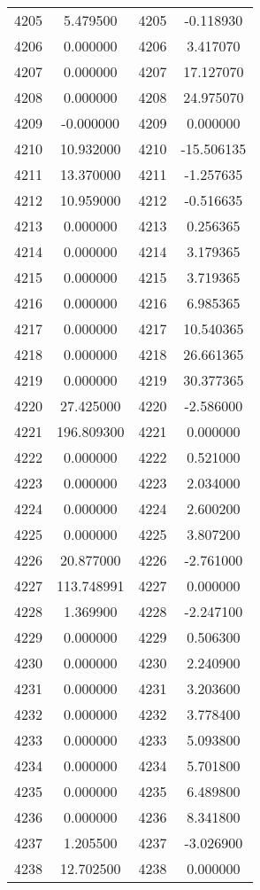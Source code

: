 \documentclass[12pt]{article}
\begin{document}
\begin{longtable}{@{}cccc@{}}
4205 & 5.479500 & 4205 & -0.118930 \\
4206 & 0.000000 & 4206 & 3.417070 \\
4207 & 0.000000 & 4207 & 17.127070 \\
4208 & 0.000000 & 4208 & 24.975070 \\
4209 & -0.000000 & 4209 & 0.000000 \\
4210 & 10.932000 & 4210 & -15.506135 \\
4211 & 13.370000 & 4211 & -1.257635 \\
4212 & 10.959000 & 4212 & -0.516635 \\
4213 & 0.000000 & 4213 & 0.256365 \\
4214 & 0.000000 & 4214 & 3.179365 \\
4215 & 0.000000 & 4215 & 3.719365 \\
4216 & 0.000000 & 4216 & 6.985365 \\
4217 & 0.000000 & 4217 & 10.540365 \\
4218 & 0.000000 & 4218 & 26.661365 \\
4219 & 0.000000 & 4219 & 30.377365 \\
4220 & 27.425000 & 4220 & -2.586000 \\
4221 & 196.809300 & 4221 & 0.000000 \\
4222 & 0.000000 & 4222 & 0.521000 \\
4223 & 0.000000 & 4223 & 2.034000 \\
4224 & 0.000000 & 4224 & 2.600200 \\
4225 & 0.000000 & 4225 & 3.807200 \\
4226 & 20.877000 & 4226 & -2.761000 \\
4227 & 113.748991 & 4227 & 0.000000 \\
4228 & 1.369900 & 4228 & -2.247100 \\
4229 & 0.000000 & 4229 & 0.506300 \\
4230 & 0.000000 & 4230 & 2.240900 \\
4231 & 0.000000 & 4231 & 3.203600 \\
4232 & 0.000000 & 4232 & 3.778400 \\
4233 & 0.000000 & 4233 & 5.093800 \\
4234 & 0.000000 & 4234 & 5.701800 \\
4235 & 0.000000 & 4235 & 6.489800 \\
4236 & 0.000000 & 4236 & 8.341800 \\
4237 & 1.205500 & 4237 & -3.026900 \\
4238 & 12.702500 & 4238 & 0.000000 \\

\end{longtable}
\end{document}
